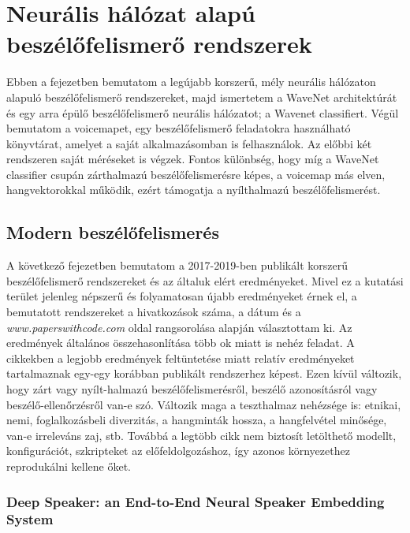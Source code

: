 \chapter{Neurális hálózat alapú beszélőfelismerő rendszerek}

Ebben a fejezetben bemutatom a legújabb korszerű, mély neurális hálózaton alapuló beszélőfelismerő rendszereket, majd ismertetem a WaveNet architektúrát és egy arra épülő beszélőfelismerő neurális hálózatot; a Wavenet classifiert. Végül bemutatom a voicemapet, egy beszélőfelismerő feladatokra használható könyvtárat, amelyet a saját alkalmazásomban is felhasználok. Az előbbi két rendszeren saját méréseket is végzek.
\newline
\newline
Fontos különbség, hogy míg a WaveNet classifier csupán zárthalmazú beszélőfelismerésre képes, a voicemap más elven, hangvektorokkal működik, ezért támogatja a nyílthalmazú beszélőfelismerést.

\section{Modern beszélőfelismerés} \label{section:modern_speaker_recognition}

A következő fejezetben bemutatom a 2017-2019-ben publikált korszerű beszélőfelismerő rendszereket és az általuk elért eredményeket. Mivel ez a kutatási terület jelenleg népszerű és folyamatosan újabb eredményeket érnek el, a bemutatott rendszereket a hivatkozások száma, a dátum és a \emph{www.paperswithcode.com} oldal rangsorolása alapján választottam ki.
\newline
\newline
Az eredmények általános összehasonlítása több ok miatt is nehéz feladat. A cikkekben a legjobb eredmények feltüntetése miatt relatív eredményeket tartalmaznak egy-egy korábban
publikált rendszerhez képest. Ezen kívül változik, hogy zárt vagy nyílt-halmazú beszélőfelismerésről, beszélő azonosításról vagy beszélő-ellenőrzésről van-e szó. Változik maga a teszthalmaz nehézsége is: etnikai, nemi, foglalkozásbeli diverzitás, a hangminták hossza, a hangfelvétel minősége, van-e irreleváns zaj, stb. Továbbá
a legtöbb cikk nem biztosít letölthető modellt, konfigurációt, szkripteket az előfeldolgozáshoz, így azonos környezethez reprodukálni kellene őket.


\subsection{Deep Speaker: an End-to-End Neural Speaker Embedding System}

